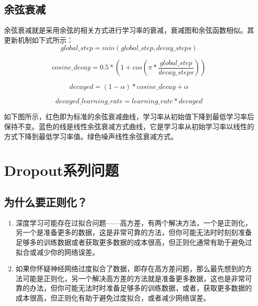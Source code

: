 
\subsection{ 余弦衰减}\label{ux4f59ux5f26ux8870ux51cf}

​
余弦衰减就是采用余弦的相关方式进行学习率的衰减，衰减图和余弦函数相似。其更新机制如下式所示：
\[
global{\_}step=min(global{\_}step,decay{\_}steps)
\]

\[
cosine{\_}decay=0.5*\left( 1+cos\left( \pi* \frac{global{\_}step}{decay{\_}steps}\right)\right)
\]

\[
decayed=(1-\alpha)*cosine{\_}decay+\alpha
\]

\[
decayed{\_}learning{\_}rate=learning{\_}rate*decayed
\]

​
如下图所示，红色即为标准的余弦衰减曲线，学习率从初始值下降到最低学习率后保持不变。蓝色的线是线性余弦衰减方式曲线，它是学习率从初始学习率以线性的方式下降到最低学习率值。绿色噪声线性余弦衰减方式。

 

\section{ Dropout系列问题}\label{dropout-ux7cfbux5217ux95eeux9898}

\subsection{为什么要正则化？}\label{ux4e3aux4ec0ux4e48ux8981ux6b63ux5219ux5316}

\begin{enumerate}
\def\labelenumi{\arabic{enumi}.}
 
\item
  深度学习可能存在过拟合问题------高方差，有两个解决方法，一个是正则化，另一个是准备更多的数据，这是非常可靠的方法，但你可能无法时时刻刻准备足够多的训练数据或者获取更多数据的成本很高，但正则化通常有助于避免过拟合或减少你的网络误差。\\
\item
  如果你怀疑神经网络过度拟合了数据，即存在高方差问题，那么最先想到的方法可能是正则化，另一个解决高方差的方法就是准备更多数据，这也是非常可靠的办法，但你可能无法时时准备足够多的训练数据，或者，获取更多数据的成本很高，但正则化有助于避免过度拟合，或者减少网络误差。
\end{enumerate}

